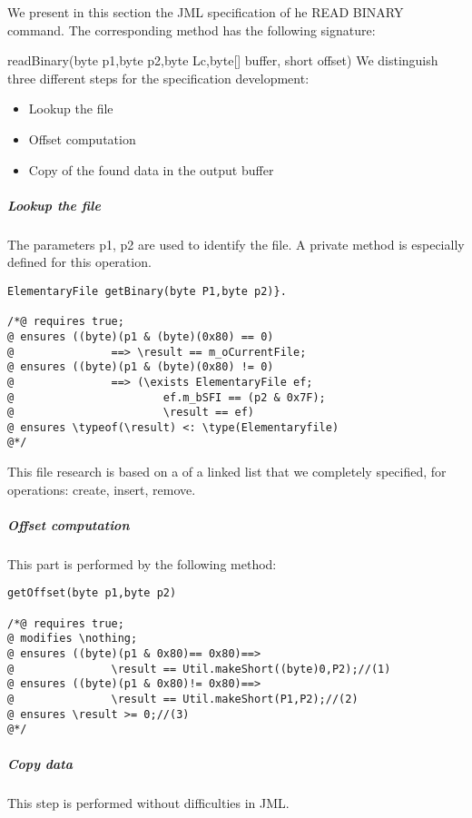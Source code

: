 We present in this section the JML specification of he READ BINARY
command. The corresponding method has the following signature:

readBinary(byte p1,byte p2,byte Lc,byte[] buffer, short offset)
We distinguish three different steps for the specification development: 
\begin{itemize}
\item Lookup the file
\item Offset computation
\item Copy of the found data in the output buffer
\end{itemize}

\subparagraph{Lookup the file}
The parameters p1, p2 are used to identify the file. A private method
is especially defined for this operation.

\begin{lstlisting}
ElementaryFile getBinary(byte P1,byte p2)}.

/*@ requires true;
@ ensures ((byte)(p1 & (byte)(0x80) == 0)
@               ==> \result == m_oCurrentFile;
@ ensures ((byte)(p1 & (byte)(0x80) != 0)
@               ==> (\exists ElementaryFile ef;
@                       ef.m_bSFI == (p2 & 0x7F);
@                       \result == ef)
@ ensures \typeof(\result) <: \type(Elementaryfile)
@*/
\end{lstlisting}
This file research is based on a of a linked list that we completely specified, for operations: create, insert, remove. 

\subparagraph{Offset computation}
This part is performed by the following method:
\begin{lstlisting}
getOffset(byte p1,byte p2)

/*@ requires true;
@ modifies \nothing;
@ ensures ((byte)(p1 & 0x80)== 0x80)==>
@               \result == Util.makeShort((byte)0,P2);//(1)
@ ensures ((byte)(p1 & 0x80)!= 0x80)==>
@               \result == Util.makeShort(P1,P2);//(2)
@ ensures \result >= 0;//(3)
@*/
\end{lstlisting}
\subparagraph{Copy data}
This step is performed without difficulties in JML. 


